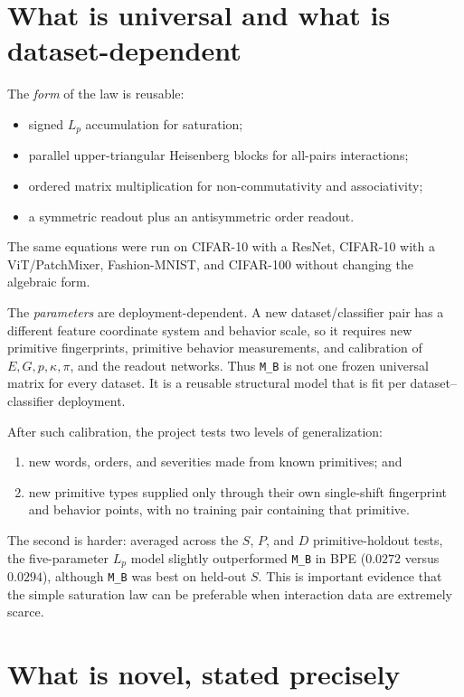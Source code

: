 \documentclass[11pt,a4paper]{article}
\newcommand{\MB}{\texttt{M\_B}}
\begin{document}
\section{What is universal and what is dataset-dependent}

The \emph{form} of the law is reusable:
\begin{itemize}
  \item signed $L_p$ accumulation for saturation;
  \item parallel upper-triangular Heisenberg blocks for all-pairs interactions;
  \item ordered matrix multiplication for non-commutativity and associativity;
  \item a symmetric readout plus an antisymmetric order readout.
\end{itemize}
The same equations were run on CIFAR-10 with a ResNet, CIFAR-10 with a
ViT/PatchMixer, Fashion-MNIST, and CIFAR-100 without changing the algebraic
form.

The \emph{parameters} are deployment-dependent.  A new dataset/classifier pair
has a different feature coordinate system and behavior scale, so it requires
new primitive fingerprints, primitive behavior measurements, and calibration
of $E,G,p,\kappa,\pi$, and the readout networks.  Thus \MB{} is not one frozen
universal matrix for every dataset.  It is a reusable structural model that is
fit per dataset--classifier deployment.

After such calibration, the project tests two levels of generalization:
\begin{enumerate}
  \item new words, orders, and severities made from known primitives; and
  \item new primitive types supplied only through their own single-shift
  fingerprint and behavior points, with no training pair containing that
  primitive.
\end{enumerate}
The second is harder: averaged across the $S$, $P$, and $D$ primitive-holdout
tests, the five-parameter $L_p$ model slightly outperformed \MB{} in BPE
($0.0272$ versus $0.0294$), although \MB{} was best on held-out $S$.  This is
important evidence that the simple saturation law can be preferable when
interaction data are extremely scarce.

\section{What is novel, stated precisely}
\end{document}
